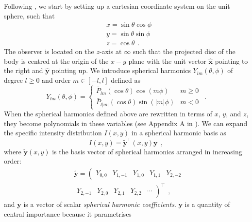 \documentclass[12pt,dvipsnames]{report}
\newcommand{\hquad}{~~}
\begin{document}
Following \citet{2019AJ....157...64L}, we start by setting up a cartesian
coordinate system on the unit sphere, such that
\begin{align}
     & x=\sin \theta \cos \phi \\
     & y=\sin \theta \sin \phi \\
     & z=\cos \theta
     \hquad.
\end{align}
The observer is located on the $z$-axis at $\infty$ such that the projected disc
of the body is centred at the origin of the $x-y$ plane with the unit vector
$\hat{\mathbf{x}}$ pointing to the right and $\hat{\mathbf{y}}$ pointing up.
We introduce spherical harmonics $Y_{l m}(\theta, \phi)$ of degree $l\geq 0$ and order
$m\in [-l, l]$ defined  as
\begin{equation}
    Y_{l m}(\theta, \phi)= \begin{cases}\bar{P}_{l m}(\cos \theta) \cos (m \phi) & m \geqslant 0 \\ \bar{P}_{l|m|}(\cos \theta) \sin (|m| \phi) & m<0\end{cases}
    \hquad.
    \label{eq:spherical_harmonics}
\end{equation}
When the spherical harmonics defined above are rewritten in terms of $x$, $y$, and $z$,
they become polynomials in these variables (see Appendix A in \citet{2019AJ....157...64L}).
We can expand the specific intensity distribution $I(x,y)$ in a spherical harmonic basis
as
\begin{equation}
    I(x, y)=\tilde{\mathbf{y}}^{\intercal}(x, y) \mathbf{y}
    \hquad,
    \label{eq:sh_expansion}
\end{equation}
where $\tilde{\mathbf{y}}(x,y)$ is the basis vector of spherical harmonics arranged in
increasing order:
\begin{align}
     & \tilde{\mathbf{y}}=\left(\begin{array}{lllll}
                                    Y_{0,0} & Y_{1,-1} & Y_{1,0} & Y_{1,1} & Y_{2,-2}
                                \end{array}\right. \\
     & \left.\begin{array}{lllll}
                 Y_{2,-1} & Y_{2,0} & Y_{2,1} & Y_{2,2} & \cdots
             \end{array}\right)^{\intercal} 
             \hquad,
\end{align}
and $\mathbf{y}$ is a vector of scalar \emph{spherical harmonic coefficients}.
$\mathbf{y}$ is a quantity of central importance because it parametrises 
\end{document}

